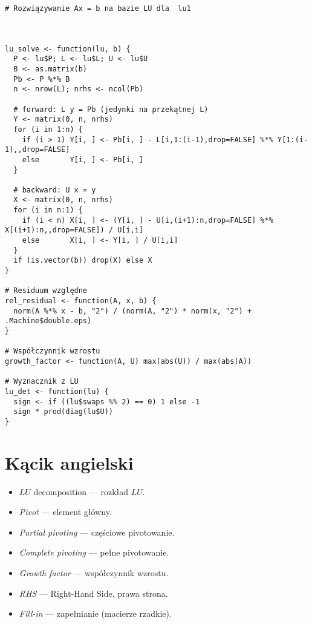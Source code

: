 \documentclass[12pt]{article}
\begin{document}
\begin{lstlisting}
# Rozwiązywanie Ax = b na bazie LU dla  lu1 



lu_solve <- function(lu, b) {
  P <- lu$P; L <- lu$L; U <- lu$U
  B <- as.matrix(b)
  Pb <- P %*% B
  n <- nrow(L); nrhs <- ncol(Pb)

  # forward: L y = Pb (jedynki na przekątnej L)
  Y <- matrix(0, n, nrhs)
  for (i in 1:n) {
    if (i > 1) Y[i, ] <- Pb[i, ] - L[i,1:(i-1),drop=FALSE] %*% Y[1:(i-1),,drop=FALSE]
    else       Y[i, ] <- Pb[i, ]
  }

  # backward: U x = y
  X <- matrix(0, n, nrhs)
  for (i in n:1) {
    if (i < n) X[i, ] <- (Y[i, ] - U[i,(i+1):n,drop=FALSE] %*% X[(i+1):n,,drop=FALSE]) / U[i,i]
    else       X[i, ] <- Y[i, ] / U[i,i]
  }
  if (is.vector(b)) drop(X) else X
}

# Residuum względne
rel_residual <- function(A, x, b) {
  norm(A %*% x - b, "2") / (norm(A, "2") * norm(x, "2") + .Machine$double.eps)
}

# Współczynnik wzrostu
growth_factor <- function(A, U) max(abs(U)) / max(abs(A))

# Wyznacznik z LU
lu_det <- function(lu) {
  sign <- if ((lu$swaps %% 2) == 0) 1 else -1
  sign * prod(diag(lu$U))
}
\end{lstlisting}



\section*{Kącik angielski}
\begin{itemize}[label=$\diamond$]
\item $LU$ decomposition --- rozkład $LU$.
\item \emph{Pivot} --- element główny.
\item \emph{Partial pivoting} --- częściowe pivotowanie.
\item \emph{Complete pivoting} --- pełne pivotowanie.
\item \emph{Growth factor} --- współczynnik wzrostu.
\item \emph{RHS} --- Right-Hand Side, prawa strona.
\item \emph{Fill-in} --- zapełnianie (macierze rzadkie).
\end{itemize}
\end{document}
